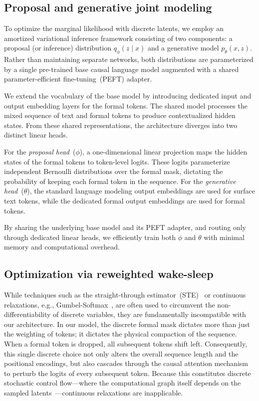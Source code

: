 \documentclass[11pt]{article}
\theoremstyle{plain}
\theoremstyle{definition}
\begin{document}
\subsection{Proposal and generative joint modeling}
\label{sec:modeling}

To optimize the marginal likelihood with discrete latents, we employ an
amortized variational inference framework consisting of two components: a
proposal (or inference) distribution \( q_{\phi}(z \mid x) \) and a generative
model \( p_{\theta}(x, z) \). Rather than maintaining separate networks, both
distributions are parameterized by a single pre-trained base causal language
model augmented with a shared parameter-efficient fine-tuning~(PEFT) adapter.

We extend the vocabulary of the base model by introducing dedicated input and
output embedding layers for the formal tokens. The shared model processes the
mixed sequence of text and formal tokens to produce contextualized hidden
states. From these shared representations, the architecture diverges into two
distinct linear heads.

For the \emph{proposal head}~(\(\phi\)), a one-dimensional linear projection
maps the hidden states of the formal tokens to token-level logits. These logits
parameterize independent Bernoulli distributions over the formal mask, dictating
the probability of keeping each formal token in the sequence. For the
\emph{generative head}~(\(\theta\)), the standard language modeling output
embeddings are used for surface text tokens, while the dedicated formal output
embeddings are used for formal tokens.

By sharing the underlying base model and its PEFT adapter, and routing only
through dedicated linear heads, we efficiently train both \( \phi \) and \(
\theta \) with minimal memory and computational overhead.

\subsection{Optimization via reweighted wake-sleep}
\label{sec:optimization}

While techniques such as the straight-through estimator~(STE)~\cite{ste-2013} or
continuous relaxations, e.g., Gumbel-Softmax~\cite{gumbel-softmax-2017,
concrete-distribution-2017}, are often used to circumvent the
non-differentiability of discrete variables, they are fundamentally incompatible
with our architecture. In our model, the discrete formal mask dictates more than
just the weighting of tokens; it dictates the physical compaction of the
sequence. When a formal token is dropped, all subsequent tokens shift left.
Consequently, this single discrete choice not only alters the overall sequence
length and the positional encodings, but also cascades through the causal
attention mechanism to perturb the logits of every subsequent token. Because
this constitutes discrete stochastic control flow---where the computational
graph itself depends on the sampled
latents~\cite{stochastic-computation-graphs-2016}---continuous relaxations are
inapplicable.
\end{document}

